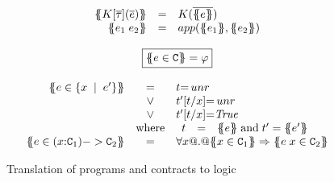 \documentclass[preprint]{sigplanconf}
\begin{document}
\begin{figure}
\[\begin{array}{c}
\begin{array}{rcl}
\etrans{\Sigma}{\Gamma}{K[\ol{\tau}](\ol{e})} & = & \formula{K(\ol{\etrans{\Sigma}{\Gamma}{e}})} \\
\etrans{\Sigma}{\Gamma}{e_1\;e_2} & = & \formula{app(\etrans{\Sigma}{\Gamma}{e_1},
                                                     \etrans{\Sigma}{\Gamma}{e_2})}
\end{array}
\\ \\
\ruleform{\ctrans{\Sigma}{\Gamma}{e \in \Ct} = \formula{\phi}} \\ \\
\begin{array}{rcl}
\ctrans{\Sigma}{\Gamma}{e \in \{x\;\mid\;e' \}}
  & = & \formula{t{=}\unr} \\
  & \lor & \formula{t'[t/x]{=}\unr} \\
  & \lor & \formula{t'[t/x]{=}\True} \\
  & \mbox{where} &
    \begin{array}[t]{rcl}
      t  & = & \etrans{\Sigma}{\Gamma}{e} \; \text{and} \; t' = \etrans{\Sigma}{\Gamma}{e'}
    \end{array}
\\
\ctrans{\Sigma}{\Gamma}{e \in (x{:}\Ct_1) -> \Ct_2}
  & = & \formula{\forall x @.@ \ctrans{\Sigma}{\Gamma,x}{x \in \Ct_1}
                          \Rightarrow \ctrans{\Sigma}{\Gamma,x}{e\;x \in \Ct_2}}
\end{array}
\end{array}\]
\caption{Translation of programs and contracts to logic}
   \label{fig:etrans}\label{fig:contracts-minless}
\end{figure}
\end{document}
